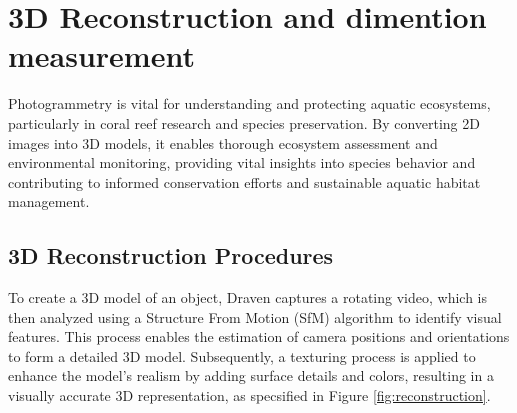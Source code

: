\documentclass{article}
\begin{document}
\section*{3D Reconstruction and dimention measurement}
Photogrammetry is vital for understanding and protecting aquatic ecosystems, particularly in coral reef research and species preservation. By converting 2D images into 3D models, it enables thorough ecosystem assessment and environmental monitoring, providing vital insights into species behavior and contributing to informed conservation efforts and sustainable aquatic habitat management.
\subsection*{3D Reconstruction Procedures}
To create a 3D model of an object, Draven captures a rotating video, which is then analyzed using a Structure From Motion (SfM) algorithm to identify visual features. This process enables the estimation of camera positions and orientations to form a detailed 3D model. Subsequently, a texturing process is applied to enhance the model's realism by adding surface details and colors, resulting in a visually accurate 3D representation, as specsified in Figure \ref{fig:reconstruction}.
\end{document}
